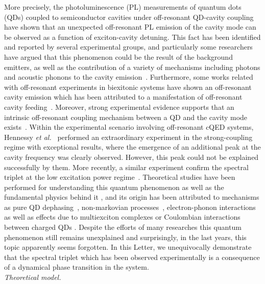 \documentclass[aps,prl,showpacs,twocolumn]{revtex4}
\begin{document}
More precisely, the photoluminescence (PL) measurements of quantum dots (QDs) coupled to semiconductor cavities under off-resonant QD-cavity coupling have shown that an unexpected off-resonant PL emission of the cavity mode can be observed as a function of exciton-cavity detuning. This fact has been identified and reported by several experimental groups, and particularly some researchers have argued that this phenomenon could be the result of the background emitters, as well as the contribution of a variety of mechanisms including photons and acoustic phonons to the cavity emission~\cite{Press:2007}. Furthermore, some works related with off-resonant experiments in biexitonic systems have shown an off-resonant cavity emission which has been attributed to a manifestation of off-resonant cavity feeding~\cite{Winger:2008}. Moreover, strong experimental evidence supports that an intrinsic off-resonant coupling mechanism between a QD and the cavity mode exists~\cite{Kaniber:2008}. Within the experimental scenario involving off-resonant cQED systems, Hennessy {\it et al.}~\cite{Hennessy:2007} performed an extraordinary experiment in the strong-coupling regime with exceptional results, where the emergence of an additional peak at the cavity frequency was clearly observed. However, this peak could not be explained successfully by them. More recently, a similar experiment confirm the spectral triplet at the low excitation power regime~\cite{Ota:2009}. Theoretical studies have been performed for understanding this quantum phenomenon as well as the fundamental physics behind it \cite{Yamaguchi:2008,Naesby:2008,Hughes:2009}, and its origin has been attributed to mechanisms as pure QD dephasing~\cite{Auffeves:2009,Gonzalez:2010},  non-markovian processes~\cite{Yamaguchi:2009}, electron-phonon interactions \cite{Hohenester:2009,Hohenester:2010,Hughes:2011,Roy:2011b} as well as effects due to multiexciton complexes \cite{Winger:2009} or Coulombian interactions between charged QDs \cite{Chauvin:2009}. Despite the efforts of many researches this quantum phenomenon still remains unexplained and surprisingly, in the last years, this topic apparently seems forgotten. In this Letter, we unequivocally demonstrate that the spectral triplet which has been observed experimentally is a consequence of a dynamical phase transition in the system.
\\
\textit{Theoretical model.}\textendash
\end{document}
